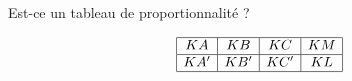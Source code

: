 

\begin{rituel}

\begin{center}
    \Large
   
\end{center}

    Est-ce un tableau de proportionnalité ?

    \begin{equation*}
        \begin{array}[]{|c|c|c|c|}
            \hline
            KA&KB&KC&KM\\
            \hline
            KA'&KB'&KC'&KL\\
            \hline
        \end{array}
    \end{equation*}
    
\end{rituel}
